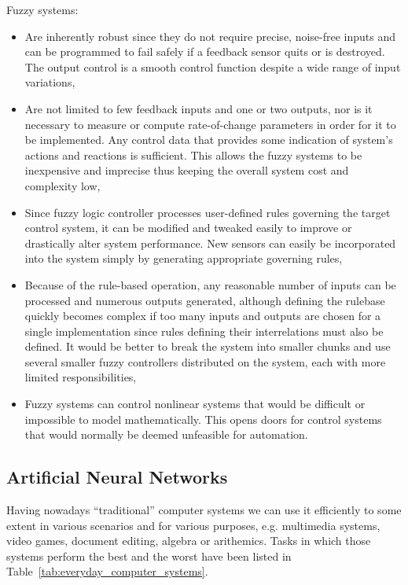 Fuzzy systems:
\begin{itemize}
\item Are inherently robust since they do not require precise, noise-free inputs and can be programmed to fail safely if a feedback sensor quits or is destroyed. The output control is a smooth control function despite a wide range of input variations,
\item Are not limited to few feedback inputs and one or two outputs, nor is it necessary to measure or compute rate-of-change parameters in order for it to be implemented. Any control data that provides some indication of system's actions and reactions is sufficient. This allows the fuzzy systems to be inexpensive and imprecise thus keeping the overall system cost and complexity low,
\item Since fuzzy logic controller processes user-defined rules governing the target control system, it can be modified and tweaked easily to improve or drastically alter system performance. New sensors can easily be incorporated into the system simply by generating appropriate governing rules,
\item Because of the rule-based operation, any reasonable number of inputs can be processed and numerous outputs generated, although defining the rulebase quickly becomes complex if too many inputs and outputs are chosen for a single implementation since rules defining their interrelations must also be defined. It would be better to break the system into smaller chunks and use several smaller fuzzy controllers distributed on the system, each with more limited responsibilities,
\item Fuzzy systems can control nonlinear systems that would be difficult or impossible to model mathematically. This opens doors for control systems that would normally be deemed unfeasible for automation.
\end{itemize}

\clearpage
\subsection{Artificial Neural Networks}
Having nowadays ``traditional'' computer systems we can use it efficiently to some extent in various scenarios and for various purposes, e.g. multimedia systems, video games, document editing, algebra or arithemics.
Tasks in which those systems perform the best and the worst have been listed in Table~\ref{tab:everyday_computer_systems}.

